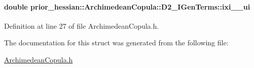 \paragraph[{\texorpdfstring{ixi\+\_\+1\+\_\+ui}{ixi_1_ui}}]{\setlength{\rightskip}{0pt plus 5cm}double prior\+\_\+hessian\+::\+Archimedean\+Copula\+::\+D2\+\_\+\+I\+Gen\+Terms\+::ixi\+\_\+\_\+ui}\hypertarget{structprior__hessian_1_1ArchimedeanCopula_1_1D2__IGenTerms_a50c3840a4d177d78273e18bc242f119f}{}\label{structprior__hessian_1_1ArchimedeanCopula_1_1D2__IGenTerms_a50c3840a4d177d78273e18bc242f119f}


Definition at line 27 of file Archimedean\+Copula.\+h.



The documentation for this struct was generated from the following file\+:\begin{DoxyCompactItemize}
\item 
\hyperlink{ArchimedeanCopula_8h}{Archimedean\+Copula.\+h}\end{DoxyCompactItemize}
